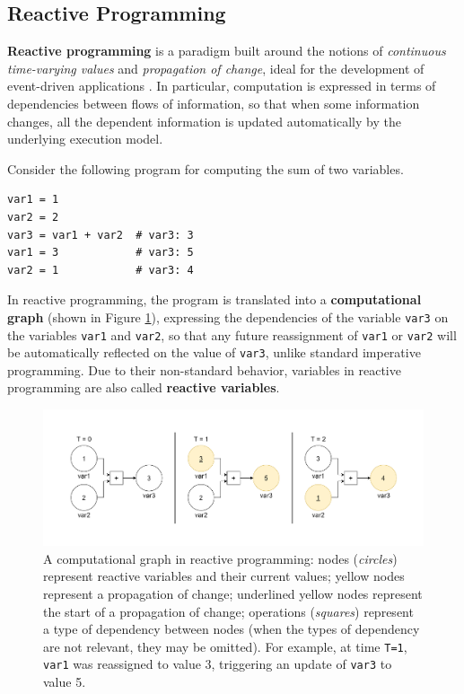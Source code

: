 
\subsection{Reactive Programming}
\label{section:background:concepts:reactive-programming}

\textbf{Reactive programming} is a paradigm built around the notions of
\textit{continuous time-varying values} and \textit{propagation of change},
ideal for the development of event-driven applications
\cite{ReactiveProgramming}. In particular, computation is expressed in terms of
dependencies between flows of information, so that when some information
changes, all the dependent information is updated automatically by the
underlying execution model.

Consider the following program for computing the sum of two variables.

\begin{lstlisting}
var1 = 1
var2 = 2
var3 = var1 + var2  # var3: 3
var1 = 3            # var3: 5
var2 = 1            # var3: 4
\end{lstlisting}

In reactive programming, the program is translated into a \textbf{computational
graph} (shown in Figure \ref{figure:dependency-graph}), expressing the
dependencies of the variable \texttt{var3} on the variables \texttt{var1} and
\texttt{var2}, so that any future reassignment of \texttt{var1} or
\texttt{var2} will be automatically reflected on the value of \texttt{var3},
unlike standard imperative programming. Due to their non-standard behavior,
variables in reactive programming are also called \textbf{reactive variables}.

\begin{figure}[!ht]
  \centering
  \includegraphics[width=\textwidth]{resources/figures/dependency-graph.pdf}
  \caption[A computational graph in reactive programming]{
    A computational graph in reactive programming: nodes (\textit{circles})
    represent reactive variables and their current values; yellow nodes
    represent a propagation of change; underlined yellow nodes represent the
    start of a propagation of change; operations (\textit{squares}) represent a
    type of dependency between nodes (when the types of dependency are not
    relevant, they may be omitted). For example, at time \texttt{T=1},
    \texttt{var1} was reassigned to value 3, triggering an update of
    \texttt{var3} to value 5.
  }
  \label{figure:dependency-graph}
\end{figure}

